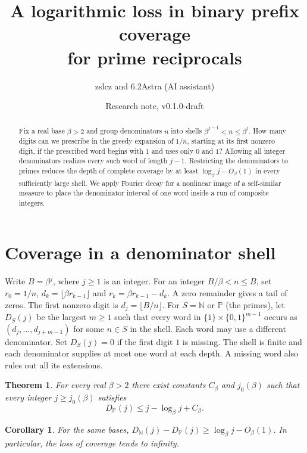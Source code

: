 \documentclass[11pt,a4paper]{article}
\title{A logarithmic loss in binary prefix coverage\\for prime reciprocals}
\author{zslcz \quad and \quad 6.2Astra (AI assistant)}
\date{Research note, v0.1.0-draft}
\newtheorem{theorem}{Theorem}
\newtheorem*{corollary}{Corollary}
\newcommand{\DP}{D_{\mathbb P}}
\newcommand{\DN}{D_{\mathbb N}}
\begin{document}
\maketitle
\begin{abstract}
Fix a real base $\beta>2$ and group denominators $n$ into shells
$\beta^{j-1}<n\le\beta^j$. How many digits can we prescribe in the greedy
expansion of $1/n$, starting at its first nonzero digit, if the prescribed
word begins with $1$ and uses only $0$ and $1$? Allowing all integer
denominators realizes every such word of length $j-1$. Restricting the
denominators to primes reduces the depth of complete coverage by at least
$\log_\beta j-O_\beta(1)$ in every sufficiently large shell. We apply
Fourier decay for a nonlinear image of a self-similar measure to place the
denominator interval of one word inside a run of composite integers.
\end{abstract}

\section{Coverage in a denominator shell}
Write $B=\beta^j$, where $j\ge1$ is an integer. For an integer $B/\beta<n\le B$,
set $r_0=1/n$, $d_k=\lfloor\beta r_{k-1}\rfloor$ and
$r_k=\beta r_{k-1}-d_k$. A zero remainder gives a tail of zeros. The first
nonzero digit is $d_j=\lfloor B/n\rfloor$. For $S=\mathbb N$ or $\mathbb P$
(the primes), let $D_S(j)$ be the largest $m\ge1$ such that every word in
$\{1\}\times\{0,1\}^{m-1}$ occurs as $(d_j,\ldots,d_{j+m-1})$ for some
$n\in S$ in the shell. Each word may use a different denominator. Set
$D_S(j)=0$ if the first digit $1$ is missing. The shell is finite and
each denominator supplies at most one word at each depth. A missing word
also rules out all its extensions.

\begin{theorem}\label{main}
For every real $\beta>2$ there exist constants $C_\beta$ and $j_0(\beta)$
such that every integer $j\ge j_0(\beta)$ satisfies
\[
  \DP(j)\le j-\log_\beta j+C_\beta .
\]
\end{theorem}
\begin{corollary}
For the same bases, $\DN(j)-\DP(j)\ge\log_\beta j-O_\beta(1)$.
In particular, the loss of coverage tends to infinity.
\end{corollary}
\end{document}
